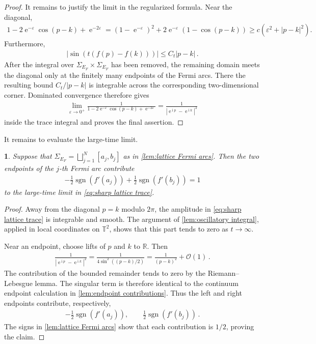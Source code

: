 \documentclass[a4paper,10pt]{article}
\numberwithin{equation}{section}
\theoremstyle{plain}
\theoremstyle{plain}
\newtheorem{lem}[thm]{\protect\lemmaname}
\theoremstyle{plain}
\theoremstyle{plain}
\theoremstyle{plain}
\theoremstyle{remark}
\theoremstyle{definition}
\theoremstyle{plain}
\providecommand{\lemmaname}{Lemma}
\newcommand{\ee}{\operatorname{e}}
\newcommand{\ii}{\operatorname{i}}
\newcommand{\TT}{\mathbb{T}}
\newcommand{\RR}{\mathbb{R}}
\newcommand{\calO}{\mathcal{O}}
\newcommand{\ve}{\varepsilon}
\newcommand{\sgn}{\operatorname{sgn}}
\newcommand{\eq}[1]{\begin{align*}#1\end{align*}}
\begin{document}
\begin{proof}
It remains to justify the limit in the regularized formula. Near the
diagonal,
\eq{1-2\ee^{-\ve}\cos(p-k)+\ee^{-2\ve}
=
(1-\ee^{-\ve})^2
+2\ee^{-\ve}(1-\cos(p-k))
\geq c\left(\ve^2+|p-k|^2\right).}
Furthermore,
\eq{\left|\sin\left(t(f(p)-f(k))\right)\right|
\leq C_t|p-k|\,.}
After the integral over
$\Sigma_{E_F}\times\Sigma_{E_F}$ has been removed, the remaining domain
meets the diagonal only at the finitely many endpoints of the Fermi arcs.
There the resulting bound $C_t/|p-k|$ is integrable across the corresponding
two-dimensional corner. Dominated convergence therefore gives
\eq{\lim_{\ve\to0^+}
\frac{1}
{1-2\ee^{-\ve}\cos(p-k)+\ee^{-2\ve}}
=
\frac{1}{|\ee^{\ii p}-\ee^{\ii k}|^2}}
inside the trace integral and proves the final assertion.
\end{proof}

It remains to evaluate the large-time limit.

\begin{lem}\label{lem:lattice endpoint contributions}
Suppose that
$\Sigma_{E_F}=\bigsqcup_{j=1}^{N}[a_j,b_j]$ as in
\cref{lem:lattice Fermi arcs}. Then the two endpoints of the $j$-th Fermi
arc contribute
\eq{-\frac{1}{2}\sgn(f'(a_j))
+\frac{1}{2}\sgn(f'(b_j))=1}
to the large-time limit in \cref{eq:sharp lattice trace}.
\end{lem}

\begin{proof}
Away from the diagonal $p=k$ modulo $2\pi$, the amplitude in
\cref{eq:sharp lattice trace} is integrable and smooth. The argument of
\cref{lem:oscillatory integral}, applied in local coordinates on $\TT^2$,
shows that this part tends to zero as $t\to\infty$.

Near an endpoint, choose lifts of $p$ and $k$ to $\RR$. Then
\eq{\frac{1}{|\ee^{\ii p}-\ee^{\ii k}|^2}
=
\frac{1}{4\sin^2((p-k)/2)}
=
\frac{1}{(p-k)^2}+\calO(1)\,.}
The contribution of the bounded remainder tends to zero by the
Riemann--Lebesgue lemma. The singular term is therefore identical to the
continuum endpoint calculation in \cref{lem:endpoint contributions}. Thus
the left and right endpoints contribute, respectively,
\eq{-\frac{1}{2}\sgn(f'(a_j)),
\qquad
\frac{1}{2}\sgn(f'(b_j))\,.}
The signs in \cref{lem:lattice Fermi arcs} show that each contribution is
$1/2$, proving the claim.
\end{proof}
\end{document}

